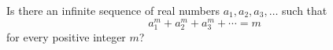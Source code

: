 Is there an infinite sequence of real numbers $a_1, a_2, a_3, \dots$ such that
\[
a_1^m + a_2^m + a_3^m + \cdots = m
\]
for every positive integer $m$?

